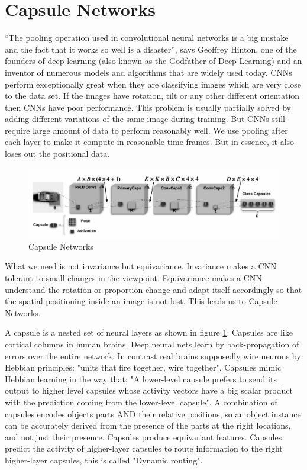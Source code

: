 \section{Capsule Networks} %
\label{sec:capsule_networks}
“The pooling operation used in convolutional neural networks is a big mistake and the fact that it works so well is a disaster”, says Geoffrey Hinton, one of the founders of deep learning (also known as the Godfather of Deep Learning) and an inventor of numerous models and algorithms that are widely used today. CNNs perform exceptionally great when they are classifying images which are very close to the data set. If the images have rotation, tilt or any other different orientation then CNNs have poor performance. This problem is usually partially solved by adding different variations of the same image during training. But CNNs still require large amount of data to perform reasonably well. We use pooling after each layer to make it compute in reasonable time frames. But in essence, it also loses out the positional data.\par\bigskip
\begin{figure}[H]
\centering\includegraphics[width=.7\textwidth]{images/caps.png}
\caption{Capsule Networks}
\label{fig:caps}
\end{figure}
What we need is not invariance but equivariance. Invariance makes a CNN tolerant to small changes in the viewpoint. Equivariance makes a CNN understand the rotation or proportion change and adapt itself accordingly so that the spatial positioning inside an image is not lost. This leads us to Capsule Networks.\par\bigskip
A capsule is a nested set of neural layers as shown in figure \ref{fig:caps}. Capsules are like cortical columns in human brains. Deep neural nets learn by back-propagation of errors over the entire network. In contrast real brains supposedly wire neurons by Hebbian principles: "units that fire together, wire together". Capsules mimic Hebbian learning in the way that: "A lower-level capsule prefers to send its output to higher level capsules whose activity vectors have a big scalar product with the prediction coming from the lower-level capsule". A combination of capsules encodes objects parts AND their relative positions, so an object instance can be accurately derived from the presence of the parts at the right locations, and not just their presence. Capsules produce equivariant features. Capsules predict the activity of higher-layer capsules to route information to the right higher-layer capsules, this is called "Dynamic routing".

